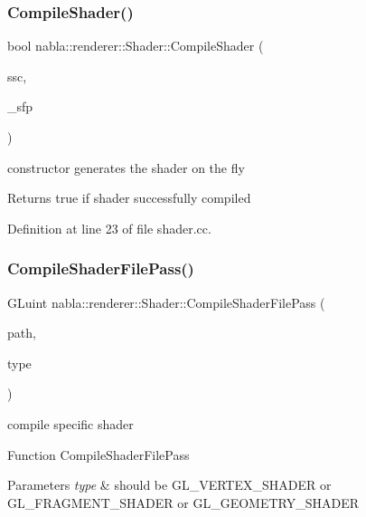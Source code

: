 \subsubsection{\texorpdfstring{CompileShader()}{CompileShader()}}
{\footnotesize\ttfamily bool nabla\+::renderer\+::\+Shader\+::\+Compile\+Shader (\begin{DoxyParamCaption}\item[{\mbox{\hyperlink{structnabla_1_1renderer_1_1_shader_source_code}{Shader\+Source\+Code}}}]{ssc,  }\item[{\mbox{\hyperlink{structnabla_1_1renderer_1_1_shader_file_path}{Shader\+File\+Path}}}]{\+\_\+sfp }\end{DoxyParamCaption})}

constructor generates the shader on the fly \begin{DoxyReturn}{Returns}
true if shader successfully compiled 
\end{DoxyReturn}


Definition at line 23 of file shader.\+cc.

\mbox{\label{classnabla_1_1renderer_1_1_shader_a5d3c867efe766a1c0c38788fe5b42b7c}} 
\subsubsection{\texorpdfstring{CompileShaderFilePass()}{CompileShaderFilePass()}}
{\footnotesize\ttfamily G\+Luint nabla\+::renderer\+::\+Shader\+::\+Compile\+Shader\+File\+Pass (\begin{DoxyParamCaption}\item[{const char $\ast$}]{path,  }\item[{G\+Lenum}]{type }\end{DoxyParamCaption})}



compile specific shader 

Function Compile\+Shader\+File\+Pass 
\begin{DoxyParams}{Parameters}
{\em type} & should be {\ttfamily G\+L\+\_\+\+V\+E\+R\+T\+E\+X\+\_\+\+S\+H\+A\+D\+ER} or {\ttfamily G\+L\+\_\+\+F\+R\+A\+G\+M\+E\+N\+T\+\_\+\+S\+H\+A\+D\+ER} or {\ttfamily G\+L\+\_\+\+G\+E\+O\+M\+E\+T\+R\+Y\+\_\+\+S\+H\+A\+D\+ER} \\
\hline
\end{DoxyParams}

